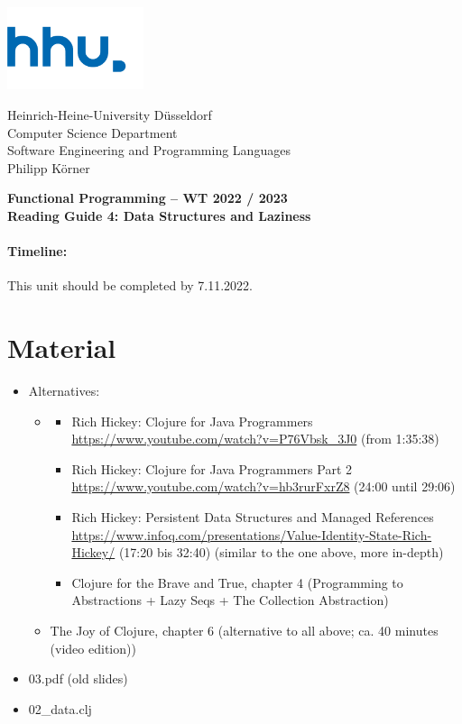 \documentclass[11pt,a4paper]{article}
\begin{document}
	
	\begin{minipage}[b]{\textwidth}
		\parbox[t]{5cm}{%
			\includegraphics[width=4cm]{unilogo}
			\hfill
		}
		\parbox[b]{11cm}{%
			Heinrich-Heine-University D\"usseldorf\\
			Computer Science Department\\
			Software Engineering and Programming Languages\\
			Philipp K\"orner
		}
	\end{minipage}
\begin{center}
	\bf
	Functional Programming -- WT 2022 / 2023\\
	Reading Guide 4: Data Structures and Laziness
\end{center}

\pagestyle{empty}

\paragraph{Timeline:} This unit should be completed by 7.11.2022.

\section{Material} 

\begin{itemize}
    \item Alternatives:
        \begin{itemize}
            \item 
                \begin{itemize}
\item Rich Hickey: Clojure for Java Programmers \url{https://www.youtube.com/watch?v=P76Vbsk_3J0} (from 1:35:38)
\item Rich Hickey: Clojure for Java Programmers Part 2 \url{https://www.youtube.com/watch?v=hb3rurFxrZ8} (24:00 until 29:06)
\item Rich Hickey: Persistent Data Structures and Managed References \url{https://www.infoq.com/presentations/Value-Identity-State-Rich-Hickey/} (17:20 bis 32:40) (similar to the one above, more in-depth)
\item Clojure for the Brave and True, chapter 4 (Programming to Abstractions + Lazy Seqs + The Collection Abstraction)
                \end{itemize}
\item The Joy of Clojure, chapter 6 (alternative to all above; ca. 40 minutes (video edition))
        \end{itemize}
\item 03.pdf (old slides)
\item 02\_data.clj
\end{itemize}
\end{document}
